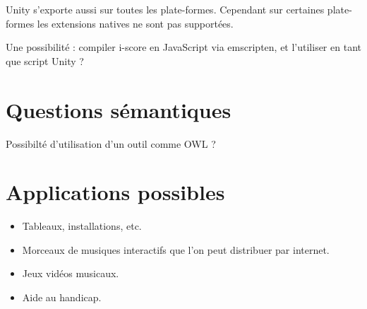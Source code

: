 \documentclass[french,12pt,a4paper]{article}
\begin{document}
Unity s'exporte aussi sur toutes les plate-formes.
Cependant sur certaines plate-formes les extensions natives ne sont 
pas supportées.

Une possibilité : compiler i-score en JavaScript via emscripten, 
et l'utiliser en tant que script Unity ? 

\section{Questions sémantiques}
Possibilté d'utilisation d'un outil comme OWL ?

\section{Applications possibles}
\begin{itemize}
\item Tableaux, installations, etc.
\item Morceaux de musiques interactifs que l'on peut distribuer par internet.
\item Jeux vidéos musicaux.
\item Aide au handicap.
\end{itemize}
\end{document}
